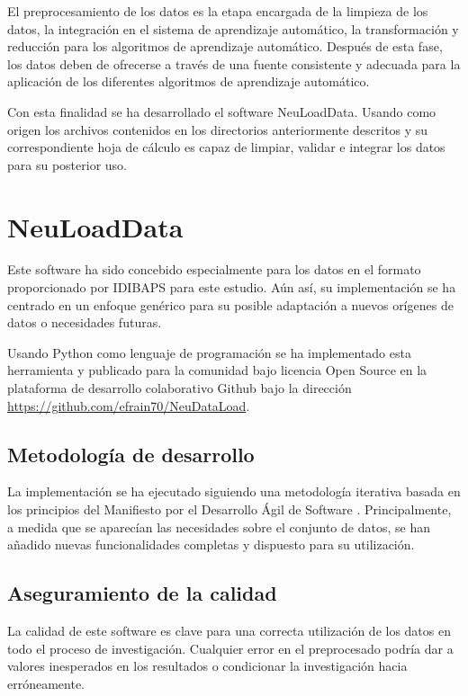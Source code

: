El preprocesamiento de los datos es la etapa encargada de la limpieza de los datos, la integración en el sistema de aprendizaje automático, la transformación y reducción para los algoritmos de aprendizaje automático. Después de esta fase, los datos deben de ofrecerse a través de una fuente consistente y adecuada para la aplicación de los diferentes algoritmos de aprendizaje automático.

Con esta finalidad se ha desarrollado el software NeuLoadData. Usando como origen los archivos contenidos en los directorios anteriormente descritos y su correspondiente hoja de cálculo es capaz de limpiar, validar e integrar los datos para su posterior uso.

\section{NeuLoadData}
Este software ha sido concebido especialmente para los datos en el formato proporcionado por IDIBAPS para este estudio. Aún así, su implementación se ha centrado en un enfoque genérico para su posible adaptación a nuevos orígenes de datos o necesidades futuras.

Usando Python como lenguaje de programación se ha implementado esta herramienta y publicado para la comunidad bajo licencia Open Source en la plataforma de desarrollo colaborativo Github \cite{WhatGitHub} bajo la dirección \url{https://github.com/efrain70/NeuDataLoad}.

\subsection{Metodología de desarrollo}

La implementación se ha ejecutado siguiendo una metodología iterativa basada en los principios del Manifiesto por el Desarrollo Ágil de Software \cite{ManifiestoSoftware}. Principalmente, a medida que se aparecían las necesidades sobre el conjunto de datos, se han añadido nuevas funcionalidades completas y dispuesto para su utilización.

\subsection{Aseguramiento de la calidad}
La calidad de este software es clave para una correcta utilización de los datos en todo el proceso de investigación. Cualquier error en el preprocesado podría dar a valores inesperados en los resultados o condicionar la investigación hacia erróneamente.


